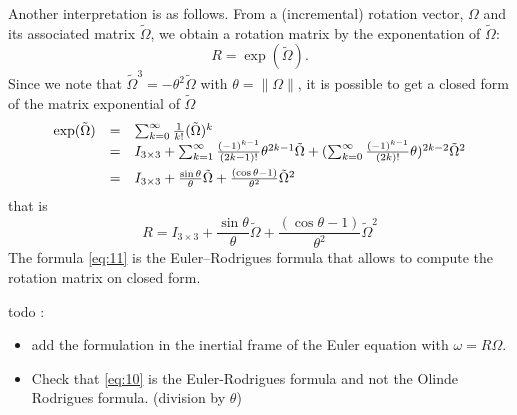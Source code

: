 Another interpretation is as follows. From a (incremental) rotation vector, $\Omega$ and its associated matrix $\tilde \Omega$, we obtain a rotation matrix by the exponentation of $\tilde \Omega$:
\begin{equation}
  \label{eq:9}
  R = \exp(\tilde\Omega).
\end{equation}
Since we note that $\tilde \Omega^ 3 = - \theta^2 \tilde \Omega$ with $\theta = \|\Omega\|$, it is possible to get a closed form of the matrix exponential of $\tilde \Omega$
\begin{equation}
  \label{eq:10}
  \begin{array}[lcl]{lcl}
    \exp(\tilde \Omega) &=& \sum_{k=0}^{\infty} \frac {1}{k!} (\tilde \Omega)^k \\
                        &=&  I_{3\times 3} + \sum_{k=1}^{\infty} \frac {(-1)^{k-1}}{(2k-1)!}  \theta ^{2k-1} \tilde \Omega + (\sum_{k=0}^{\infty} \frac {(-1)^{k-1}}{(2k)!} \theta)^{2k-2} \tilde \Omega^2\\[2mm]
                        &=&  I_{3\times 3} + \frac{\sin{\theta}} {\theta} \tilde \Omega +  \frac{(\cos{\theta}-1)}{\theta^2}\tilde \Omega^2
  \end{array}
\end{equation}
that is
\begin{equation}
  \label{eq:11}
  R =  I_{3\times 3} + \frac{\sin{\theta}} {\theta} \tilde \Omega +  \frac{(\cos{\theta}-1)}{\theta^2}\tilde \Omega^2
\end{equation}
The formula \eqref{eq:11} is the Euler--Rodrigues formula that allows to compute the rotation matrix on closed form.


\begin{ndrva}
  todo :
  \begin{itemize}
  \item add the formulation in the inertial frame of the Euler
    equation with $\omega =R \Omega$.
  \item Check that \eqref{eq:10} is the Euler-Rodrigues formula and not the Olinde Rodrigues formula. (division by $\theta$)
\end{itemize}

\end{ndrva}

